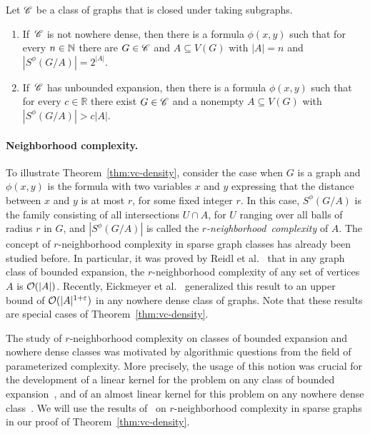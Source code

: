 \pagebreak

 \setcounter{vclower}{\value{theorem}}
 \begin{theorem}\label{thm:vc-density-lower-bound}
  Let $\mathscr{C}$ be a class of graphs that 
  is closed under taking subgraphs. 
  \begin{enumerate}
  \item If\, $\mathscr{C}$ is not nowhere dense, then there is a formula
    $\phi(x,y)$ such that for every $n\in \mathbb{N}$ there are $G\in\mathscr{C}$ and
    $A\subseteq V(G)$ with $|A|=n$ and $|S^\phi(G/A)|=2^{|A|}$.
  \item If\, $\mathscr{C}$ has unbounded expansion, then there is a formula
    $\phi(x,y)$ such that for every $c\in \mathbb{R}$ there exist
    $G\in\mathscr{C}$ and a nonempty $A\subseteq V(G)$ with
    $|S^\phi(G/A)|>c|A|$.
  \end{enumerate}
\end{theorem}

\paragraph{Neighborhood complexity.}
To illustrate Theorem~\ref{thm:vc-density}, consider the case when $G$
is a graph and~$\phi(x,y)$ is the formula with two variables $x$ and
$y$ expressing that the distance between $x$ and $y$ is at most $r$,
for some fixed integer $r$. In this case, $S^\phi(G/A)$ is the family
consisting of all intersections $U\cap A$, for $U$ ranging over all
balls of radius $r$ in $G$, and $|S^\phi(G/A)|$ is called the
\mbox{\emph{$r$-neighborhood complexity}} of $A$.  The concept of
$r$-neighborhood complexity in sparse graph classes has already been
studied before.  In particular, it was proved by Reidl et
al.~\cite{reidl2016characterising} that in any graph class of bounded
expansion, the $r$-neighborhood complexity of any set of vertices $A$
is $\mathcal{O}(|A|)$.  Recently, Eickmeyer et
al.~\cite{eickmeyer2016neighborhood} generalized this result to an
upper bound of $\mathcal{O}(|A|^{1+\varepsilon})$ in any nowhere dense class of
graphs.  Note that these results are special cases of
Theorem~\ref{thm:vc-density}.

\smallskip The study of $r$-neighborhood complexity on classes of
bounded expansion and nowhere dense classes was motivated by
algorithmic questions from the field of parameterized complexity.
More precisely, the usage of this notion was crucial for the
development of a linear kernel for the {}
problem on any class of bounded
expansion~\cite{drange2016kernelization}, and of an almost linear
kernel for this problem on any nowhere dense
class~\cite{eickmeyer2016neighborhood}.  We will use the results
of~\cite{drange2016kernelization,eickmeyer2016neighborhood,reidl2016characterising}
on $r$-neighborhood complexity in sparse graphs in our proof of
Theorem~\ref{thm:vc-density}.

